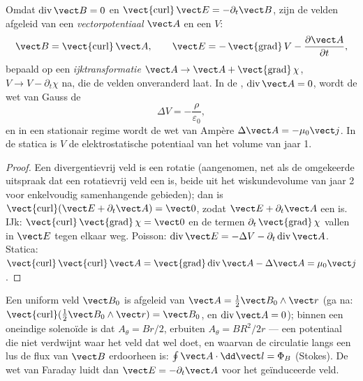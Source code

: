 \begin{proposition}\label{prop:b2:maxwell-equations:potentials}
Omdat $\operatorname{div}\vect B = 0$ en
$\operatorname{\vect{curl}}\vect E = -\partial_t
\vect B$, zijn de velden
afgeleid van een \emph{vectorpotentiaal} $\vect A$ en een \emph{} $V$:
\[
\vect B = \operatorname{\vect{curl}}\vect A , \qquad
\vect E = -\operatorname{\vect{grad}}V - \frac{\partial\vect A}{\partial t} ,
\]
bepaald op een \emph{ijktransformatie}
$\vect A \to \vect A +
\operatorname{\vect{grad}}\chi$,
$V \to V - \partial_t\chi$ na, die de velden onveranderd laat. In de
\emph{}, $\operatorname{div}\vect A = 0$, wordt de wet van
Gauss de \emph{}
\[
\Delta V = -\frac\rho{\varepsilon_0} ,
\]
en in een stationair regime wordt de wet van Ampère
$\Delta\vect A = -\mu_0\vect j$. In de statica is $V$ de elektrostatische
potentiaal van het volume van jaar 1.
\end{proposition}

\begin{proof}
Een divergentievrij veld is een rotatie (aangenomen, net als de omgekeerde
uitspraak dat een rotatievrij veld een  is, beide uit het
wiskundevolume van jaar 2 voor enkelvoudig samenhangende gebieden); dan is
$\operatorname{\vect{curl}}
(\vect E + \partial_t\vect A) = \vect 0$, zodat
$\vect E + \partial_t\vect A$ een  is. IJk:
$\operatorname{\vect{curl}}\operatorname{\vect{grad}}\chi = \vect 0$ en de
termen $\partial_t\operatorname{\vect{grad}}\chi$ vallen in $\vect E$ tegen
elkaar weg. Poisson:
$\operatorname{div}
\vect E = -\Delta V - \partial_t\operatorname{div}\vect A$.
Statica:
$\operatorname{\vect{curl}}
\operatorname{\vect{curl}}\vect A = \operatorname{\vect{grad}}\operatorname{div}\vect A - \Delta\vect A
= \mu_0\vect j$.
\end{proof}

\begin{example}\label{ex:b2:maxwell-equations:vectorpot}
Een uniform veld $\vect B_0$ is afgeleid van
$\vect A = \tfrac12\vect B_0\wedge\vect r$ (ga na:
$\operatorname{\vect{curl}}(\tfrac12\vect B_0\wedge\vect r) = \vect B_0$, en
$\operatorname{div}\vect A = 0$); binnen een oneindige solenoïde is dat
$A_\theta =
Br/2$, erbuiten $A_\theta = BR^2/2r$ --- een potentiaal die niet
verdwijnt waar het veld dat wel doet, en waarvan de circulatie langs een lus
de flux van $\vect B$ erdoorheen is: $\oint\vect A\cdot\dd\vect l = \Phi_B$
(Stokes). De wet van Faraday luidt dan $\vect E = -\partial_t\vect A$ voor
het geïnduceerde veld.
\end{example}

